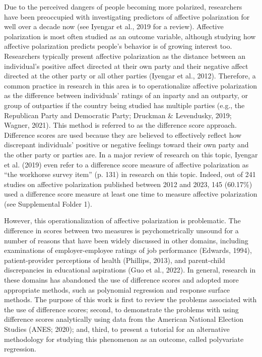 \documentclass[authordate, meta]{jote-new-article}
\begin{document}
	Due to the perceived dangers of people becoming more polarized, researchers have been preoccupied with investigating predictors of affective polarization for well over a decade now (see Iyengar et al., 2019 for a review). Affective polarization is most often studied as an outcome variable, although studying how affective polarization predicts people's behavior is of growing interest too. Researchers typically present affective polarization as the distance between an individual's positive affect directed at their own party and their negative affect directed at the other party or all other parties (Iyengar et al., 2012). Therefore, a common practice in research in this area is to operationalize affective polarization as the difference between individuals' ratings of an inparty and an outparty, or group of outparties if the country being studied has multiple parties (e.g., the Republican Party and Democratic Party; Druckman \& Levendusky, 2019; Wagner, 2021). This method is referred to as the difference score approach. Difference scores are used because they are believed to effectively reflect how discrepant individuals' positive or negative feelings toward their own party and the other party or parties are. In a major review of research on this topic, Iyengar et al. (2019) even refer to a difference score measure of affective polarization as “the workhorse survey item” (p. 131) in research on this topic. Indeed, out of 241 studies on affective polarization published between 2012 and 2023, 145 (60.17\%) used a difference score measure at least one time to measure affective polarization (see Supplemental Folder 1).



	However, this operationalization of affective polarization is problematic. The difference in scores between two measures is psychometrically unsound for a number of reasons that have been widely discussed in other domains, including examinations of employer-employee ratings of job performance (Edwards, 1994), patient-provider perceptions of health (Phillips, 2013), and parent-child discrepancies in educational aspirations (Guo et al., 2022). In general, research in these domains has abandoned the use of difference scores and adopted more appropriate methods, such as polynomial regression and response surface methods. The purpose of this work is first to review the problems associated with the use of difference scores; second, to demonstrate the problems with using difference scores analytically using data from the American National Election Studies (ANES; 2020); and, third, to present a tutorial for an alternative methodology for studying this phenomenon as an outcome, called polyvariate regression.
\end{document}
